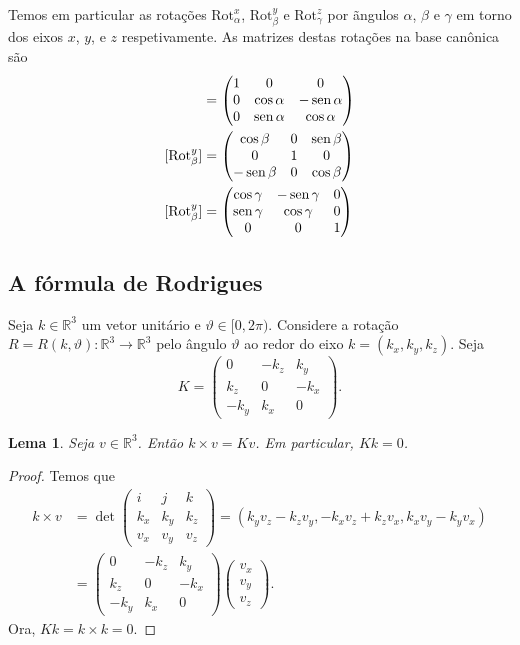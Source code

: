 \documentclass[12pt]{amsart}
\newcommand{\R}{\mathbb R}
\DeclareMathOperator{\sen}{\textrm{\rm sen}}
\newcommand{\rot}[1]{{\textrm{Rot}}_{#1}}
\newtheorem{lemma}[theorem]{Lema}
\theoremstyle{definition}
\begin{document}
Temos em particular as rotações $\rot{\alpha}^x$, $\rot\beta^y$ e $\rot\gamma^z$ 
por ãngulos $\alpha$, $\beta$ e $\gamma$ em torno dos eixos $x$, $y$, e $z$ respetivamente.
As matrizes destas rotações na base canônica são 
\begin{align*}
    [\rot\alpha^x]&=\begin{pmatrix} 1 & 0 & 0 \\ 0 & \cos\alpha & -\sen\alpha \\ 0 & \sen\alpha & \cos\alpha
    \end{pmatrix}\\
    [\rot\beta^y]&=\begin{pmatrix} \cos\beta & 0 & \sen\beta \\ 0 & 1 & 0 \\  -\sen\beta & 0 & \cos\beta\end{pmatrix}\\
    [\rot\beta^y]&=\begin{pmatrix} \cos\gamma & -\sen\gamma  & 0 \\ \sen\gamma & \cos\gamma & 0 \\ 0 & 0 & 1\end{pmatrix}
\end{align*}

\subsection{A fórmula de Rodrigues}
Seja $k\in\R^3$ um vetor unitário e $\vartheta\in[0,2\pi)$. Considere 
a rotação $R=R(k,\vartheta):\R^3\to\R^3$ pelo ângulo $\vartheta$ ao redor do eixo $k=(k_x,k_y,k_z)$. Seja 
\[ 
    K=\begin{pmatrix} 0 & -k_z & k_y \\ k_z & 0 & -k_x \\ -k_y & k_x & 0\end{pmatrix}.
\]
\begin{lemma}
    Seja $v\in\R^3$. Então $k\times v=Kv$. Em particular, $Kk=0$.
\end{lemma}
\begin{proof}
    Temos que 
    \begin{align*}
        k\times v&=\det\begin{pmatrix} i & j & k \\ k_x & k_y & k_z \\ v_x & v_y & v_z \end{pmatrix}
            =(k_yv_z-k_zv_y,-k_xv_z+k_zv_x,k_xv_y-k_yv_x)\\
            &=\begin{pmatrix} 0 & -k_z & k_y \\ k_z & 0 & -k_x \\ -k_y & k_x & 0\end{pmatrix}\begin{pmatrix} v_x \\ v_y \\ v_z\end{pmatrix}.
    \end{align*}
Ora, $Kk=k\times k=0$.
\end{proof}
\end{document}
